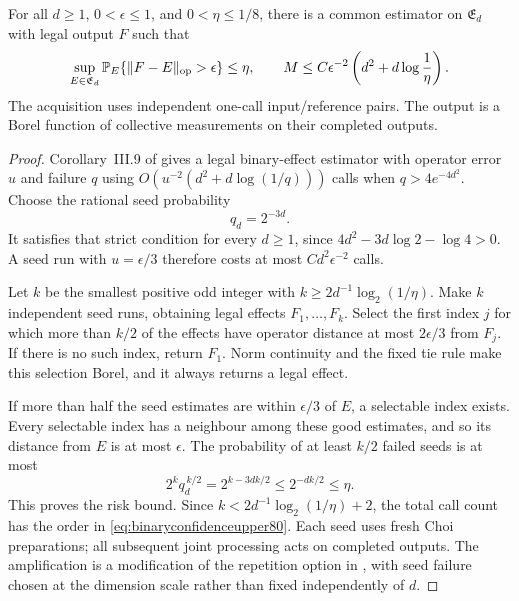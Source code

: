 \begin{lemma}
\label{lem:binaryconfidenceupper80}
For all $d\ge1$, $0<\epsilon\le1$, and $0<\eta\le1/8$,
there is a common estimator on $\mathfrak E_d$ with legal output
$F$ such that
\begin{equation}\label{eq:binaryconfidenceupper80}
 \sup_{E\in\mathfrak E_d}
       \mathbb P_E\{\|F-E\|_{\rm op}>\epsilon\}\le\eta,\qquad
 M\le C\epsilon^{-2}
             \left(d^2+d\log\frac1\eta\right).
\end{equation}
The acquisition uses independent one-call input/reference pairs.
The output is a Borel function of collective measurements on their
completed outputs.
\end{lemma}
\begin{proof}
Corollary~III.9 of \cite{MB67} gives a legal binary-effect estimator
with operator error $u$ and failure $q$ using
$O(u^{-2}(d^2+d\log(1/q)))$ calls when
$q>4e^{-4d^2}$.  Choose the rational seed probability
\[
 q_d=2^{-3d}.
\]
It satisfies that strict condition for every $d\ge1$, since
$4d^2-3d\log2-\log4>0$.  A seed run with $u=\epsilon/3$
therefore costs at most $Cd^2\epsilon^{-2}$ calls.

Let $k$ be the smallest positive odd integer with
$k\ge2d^{-1}\log_2(1/\eta)$.  Make $k$ independent seed runs,
obtaining legal effects $F_1,\ldots,F_k$.  Select the first index
$j$ for which more than $k/2$ of the effects have operator distance
at most $2\epsilon/3$ from $F_j$.  If there is no such index,
return $F_1$.  Norm continuity and the fixed tie rule make this
selection Borel, and it always returns a legal effect.

If more than half the seed estimates are within $\epsilon/3$
of $E$, a selectable index exists.  Every selectable index has a
neighbour among these good estimates, and so its distance from
$E$ is at most $\epsilon$.  The probability of at least $k/2$
failed seeds is at most
\[
 2^k q_d^{\,k/2}
 =2^{k-3dk/2}\le2^{-dk/2}\le\eta.
\]
This proves the risk bound.  Since
$k<2d^{-1}\log_2(1/\eta)+2$, the total call count has the order
in \eqref{eq:binaryconfidenceupper80}.  Each seed uses fresh Choi
preparations; all subsequent joint processing acts on completed
outputs.  The amplification is a modification of the repetition
option in \cite[Remark~III.4]{MB67}, with seed failure chosen at
the dimension scale rather than fixed independently of $d$.
\end{proof}

